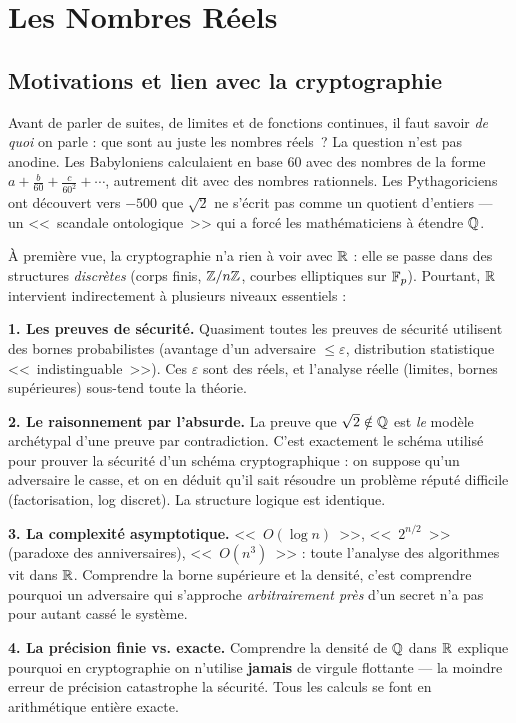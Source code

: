 \chapter{Les Nombres Réels}

\section{Motivations et lien avec la cryptographie}

Avant de parler de suites, de limites et de fonctions continues, il faut savoir \emph{de quoi} on parle : que sont au juste les nombres réels~? La question n'est pas anodine. Les Babyloniens calculaient en base 60 avec des nombres de la forme $a + \frac{b}{60} + \frac{c}{60^2} + \cdots$, autrement dit avec des nombres rationnels. Les Pythagoriciens ont découvert vers $-500$ que $\sqrt{2}$ ne s'écrit pas comme un quotient d'entiers --- un <<~scandale ontologique~>> qui a forcé les mathématiciens à étendre $\mathbb{Q}$.

\begin{intuitionbox}
À première vue, la cryptographie n'a rien à voir avec $\mathbb{R}$ : elle se passe dans des structures \emph{discrètes} (corps finis, $\mathbb{Z}/n\mathbb{Z}$, courbes elliptiques sur $\mathbb{F}_p$). Pourtant, $\mathbb{R}$ intervient indirectement à plusieurs niveaux essentiels :

\textbf{1. Les preuves de sécurité.} Quasiment toutes les preuves de sécurité utilisent des bornes probabilistes (avantage d'un adversaire $\leqslant \varepsilon$, distribution statistique <<~indistinguable~>>). Ces $\varepsilon$ sont des réels, et l'analyse réelle (limites, bornes supérieures) sous-tend toute la théorie.

\textbf{2. Le raisonnement par l'absurde.} La preuve que $\sqrt{2} \notin \mathbb{Q}$ est \emph{le} modèle archétypal d'une preuve par contradiction. C'est exactement le schéma utilisé pour prouver la sécurité d'un schéma cryptographique : on suppose qu'un adversaire le casse, et on en déduit qu'il sait résoudre un problème réputé difficile (factorisation, log discret). La structure logique est identique.

\textbf{3. La complexité asymptotique.} <<~$O(\log n)$~>>, <<~$2^{n/2}$~>> (paradoxe des anniversaires), <<~$O(n^3)$~>> : toute l'analyse des algorithmes vit dans $\mathbb{R}$. Comprendre la borne supérieure et la densité, c'est comprendre pourquoi un adversaire qui s'approche \emph{arbitrairement près} d'un secret n'a pas pour autant cassé le système.

\textbf{4. La précision finie vs. exacte.} Comprendre la densité de $\mathbb{Q}$ dans $\mathbb{R}$ explique pourquoi en cryptographie on n'utilise \textbf{jamais} de virgule flottante --- la moindre erreur de précision catastrophe la sécurité. Tous les calculs se font en arithmétique entière exacte.
\end{intuitionbox}


